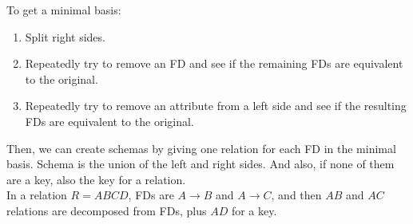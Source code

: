 \documentclass[11pt,a4paper,twocolumn]{book}
\begin{document}
To get a minimal basis:

\begin{enumerate}
\item Split right sides.
\item Repeatedly try to remove an FD and see if the remaining FDs are equivalent to the original.
\item Repeatedly try to remove an attribute from a left side and see if the resulting FDs are equivalent to the original.
\end{enumerate}

Then, we can create schemas by giving one relation for each FD in the minimal basis. Schema is the union of the left and right sides. And also, if none of them are a key, also the key for a relation.\\

In a relation $R=ABCD$, FDs are $A \to B$ and $A \to C$, and then $AB$ and $AC$ relations are decomposed from FDs, plus $AD$ for a key.
\end{document}
